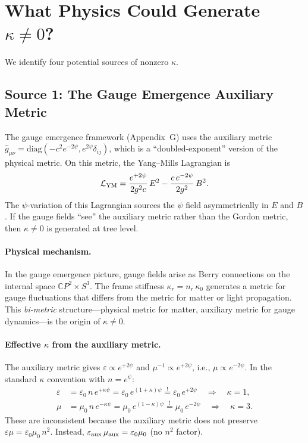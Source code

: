 \documentclass[11pt,a4paper]{article}
\theoremstyle{definition}
\theoremstyle{remark}
\begin{document}
\section{What Physics Could Generate $\kappa \neq 0$?}

We identify four potential sources of nonzero $\kappa$.

\subsection{Source 1: The Gauge Emergence Auxiliary Metric}

The gauge emergence framework (Appendix~G) uses the auxiliary metric
$\hat{g}_{\mu\nu} = \mathrm{diag}(-c^2 e^{-2\psi}, e^{2\psi}\delta_{ij})$,
which is a ``doubled-exponent'' version of the physical metric.  On this
metric, the Yang--Mills Lagrangian is
\begin{equation}
\mathcal{L}_{\rm YM} = \frac{e^{+2\psi}}{2g^2 c}\,E^2
- \frac{c\,e^{-2\psi}}{2g^2}\,B^2.
\end{equation}
The $\psi$-variation of this Lagrangian sources the $\psi$ field
asymmetrically in $E$ and $B$.  If the gauge fields ``see'' the
auxiliary metric rather than the Gordon metric, then $\kappa \neq 0$
is generated at tree level.

\paragraph{Physical mechanism.}
In the gauge emergence picture, gauge fields arise as Berry connections
on the internal space $\mathbb{C}P^2 \times S^3$.  The frame stiffness
$\kappa_r = n_r\,\kappa_0$ generates a metric for gauge fluctuations
that differs from the metric for matter or light propagation.  This
\textit{bi-metric} structure---physical metric for matter, auxiliary
metric for gauge dynamics---is the origin of $\kappa \neq 0$.

\paragraph{Effective $\kappa$ from the auxiliary metric.}
The auxiliary metric gives $\varepsilon \propto e^{+2\psi}$ and
$\mu^{-1} \propto e^{+2\psi}$, i.e., $\mu \propto e^{-2\psi}$.
In the standard $\kappa$ convention with $n = e^\psi$:
\begin{align}
\varepsilon &= \varepsilon_0\,n\,e^{+\kappa\psi}
= \varepsilon_0\,e^{(1+\kappa)\psi}
\stackrel{!}{=} \varepsilon_0\,e^{+2\psi}
\quad\Rightarrow\quad \kappa = 1, \\[4pt]
\mu &= \mu_0\,n\,e^{-\kappa\psi}
= \mu_0\,e^{(1-\kappa)\psi}
\stackrel{!}{=} \mu_0\,e^{-2\psi}
\quad\Rightarrow\quad \kappa = 3.
\end{align}
These are inconsistent because the auxiliary metric does not preserve
$\varepsilon\mu = \varepsilon_0\mu_0\,n^2$.  Instead,
$\varepsilon_{\rm aux}\,\mu_{\rm aux} = \varepsilon_0\mu_0$ (no $n^2$ factor).
\end{document}

